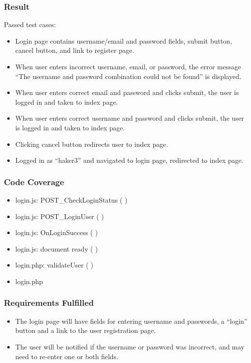 \subsubsection{Result}
Passed test cases:
\begin{itemize}
\item Login page contains username/email and password fields, submit button, cancel button, and link to register page.
\item When user enters incorrect username, email, or password, the error message ``The username and password combination could not be found'' is displayed.
\item When user enters correct email and password and clicks submit, the user is logged in and taken to index page.
\item When user enters correct username and password and clicks submit, the user is logged in and taken to index page.
\item Clicking cancel button redirects user to index page.
\item Logged in as ``haker3'' and navigated to login page, redirected to index page.
\end{itemize}
\subsubsection{Code Coverage}
\begin{itemize}
\item login.js: POST\_CheckLoginStatus ( )
\item login.js: POST\_LoginUser ( )
\item login.js: OnLoginSuccess ( )
\item login.js: document ready ( )
\item login.php: validateUser ( )
\item login.php
\end{itemize}
\subsubsection{Requirements Fulfilled}
\begin{itemize}
\item The login page will have fields for entering username and passwords, a ``login'' button and a link to the user registration page.
\item The user will be notified if the username or password was incorrect, and may need to re-enter one or both fields.
\end{itemize}

